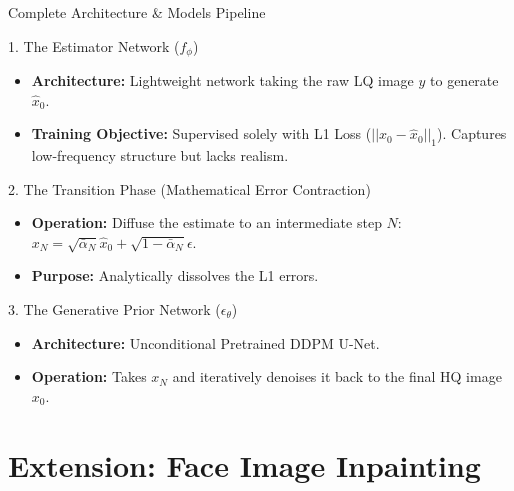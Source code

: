 \documentclass[aspectratio=169]{beamer}
\begin{document}
\begin{frame}{Complete Architecture \& Models Pipeline}
    \begin{block}{1. The Estimator Network ($f_\phi$)}
        \begin{itemize}
            \item \textbf{Architecture:} Lightweight network taking the raw LQ image $y$ to generate $\hat{x}_0$.
            \item \textbf{Training Objective:} Supervised solely with L1 Loss ($||x_0 - \hat{x}_0||_1$). Captures low-frequency structure but lacks realism.
        \end{itemize}
    \end{block}
    
    \begin{block}{2. The Transition Phase (Mathematical Error Contraction)}
        \begin{itemize}
            \item \textbf{Operation:} Diffuse the estimate to an intermediate step $N$: $x_N = \sqrt{\bar{\alpha}_N} \hat{x}_0 + \sqrt{1 - \bar{\alpha}_N} \epsilon$.
            \item \textbf{Purpose:} Analytically dissolves the L1 errors.
        \end{itemize}
    \end{block}

    \begin{block}{3. The Generative Prior Network ($\epsilon_\theta$)}
        \begin{itemize}
            \item \textbf{Architecture:} Unconditional Pretrained DDPM U-Net.
            \item \textbf{Operation:} Takes $x_N$ and iteratively denoises it back to the final HQ image $x_0$.
        \end{itemize}
    \end{block}
\end{frame}

\section{Extension: Face Image Inpainting}
\end{document}
